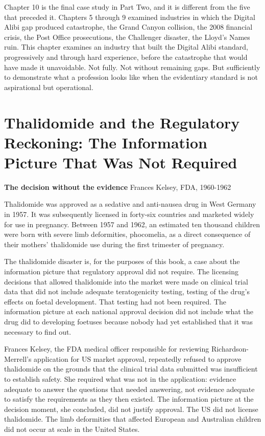 Chapter 10 is the final case study in Part Two, and it is different from the five that preceded it. Chapters 5 through 9 examined industries in which the Digital Alibi gap produced catastrophe, the Grand Canyon collision, the 2008 financial crisis, the Post Office prosecutions, the Challenger disaster, the Lloyd's Names ruin. This chapter examines an industry that built the Digital Alibi standard, progressively and through hard experience, before the catastrophe that would have made it unavoidable. Not fully. Not without remaining gaps. But sufficiently to demonstrate what a profession looks like when the evidentiary standard is not aspirational but operational.

\scenebreak

\section{Thalidomide and the Regulatory Reckoning: The Information Picture That Was Not Required}

\textbf{The decision without the evidence} Frances Kelsey, FDA, 1960-1962

Thalidomide was approved as a sedative and anti-nausea drug in West Germany in 1957. It was subsequently licensed in forty-six countries and marketed widely for use in pregnancy. Between 1957 and 1962, an estimated ten thousand children were born with severe limb deformities, phocomelia, as a direct consequence of their mothers' thalidomide use during the first trimester of pregnancy.

The thalidomide disaster is, for the purposes of this book, a case about the information picture that regulatory approval did not require. The licensing decisions that allowed thalidomide into the market were made on clinical trial data that did not include adequate teratogenicity testing, testing of the drug's effects on foetal development. That testing had not been required. The information picture at each national approval decision did not include what the drug did to developing foetuses because nobody had yet established that it was necessary to find out.

Frances Kelsey, the FDA medical officer responsible for reviewing Richardson-Merrell's application for US market approval, repeatedly refused to approve thalidomide on the grounds that the clinical trial data submitted was insufficient to establish safety. She required what was not in the application: evidence adequate to answer the questions that needed answering, not evidence adequate to satisfy the requirements as they then existed. The information picture at the decision moment, she concluded, did not justify approval. The US did not license thalidomide. The limb deformities that affected European and Australian children did not occur at scale in the United States.

